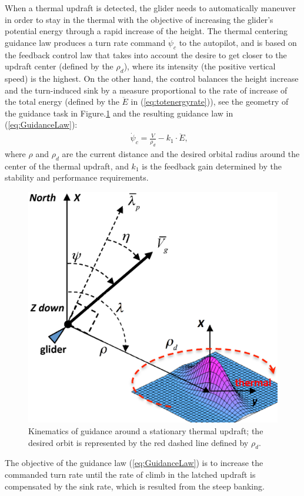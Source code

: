 \documentclass[letterpaper, 10 pt, conference]{ieeeconf}  %
\begin{document}

When a thermal updraft is detected, the glider needs to automatically maneuver in order to stay in the thermal with the objective of increasing the glider's potential energy through a rapid increase of the height. The thermal centering guidance law produces a turn rate command $\dot{\psi}_{c}$ to the autopilot, and is based on the feedback control law that takes into account the desire to get closer to the updraft center (defined by the $\rho_d$), where its intensity (the positive vertical speed) is the highest. On the other hand, the control balances the height increase and the turn-induced sink by a measure proportional to the rate of increase of the total energy (defined by the $\ddot{E}$ in (\ref{eq:totenergyrate})), see the geometry of the guidance task in Figure.\ref{fig:ThermaG} and the resulting guidance law in (\ref{eq:GuidanceLaw}):
\begin{eqnarray}
    && \dot{\psi}_{c}=\frac{V}{\rho_d}-k_1 \cdot \ddot{E},
    \label{eq:GuidanceLaw}
\end{eqnarray}
where $\rho$ and $\rho_d$ are the current distance and the desired orbital radius around the center of the thermal updraft, and $k_1$ is the feedback gain determined by the stability and performance requirements.
\begin{figure}[thpb]
  \centering
  \includegraphics[scale=0.25]{Figures/ThermalG.eps}
  \caption{Kinematics of guidance around a stationary thermal updraft;
  the desired orbit is represented by the red dashed line defined by $\rho_d$.}
  \label{fig:ThermaG}
\end{figure}
The objective of the guidance law (\ref{eq:GuidanceLaw}) is to increase the commanded turn rate until the rate of climb in the latched updraft is compensated by the sink rate, which is resulted from the steep banking.
\end{document}

